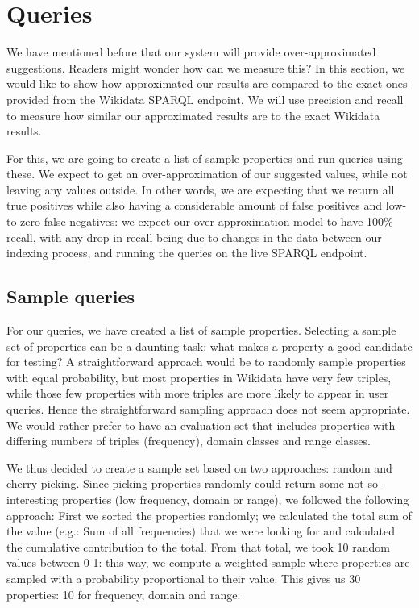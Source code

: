 
\section{Queries}

We have mentioned before that our system will provide over-approximated suggestions. Readers might wonder how can we measure this? In this section, we would like to show how approximated our results are compared to the exact ones provided from the Wikidata SPARQL endpoint. We will use precision and recall to measure how similar our approximated results are to the exact Wikidata results.

For this, we are going to create a list of sample properties and run queries using these. We expect to get an over-approximation of our suggested values, while not leaving any values outside. In other words, we are expecting that we return all true positives while also having a considerable amount of false positives and low-to-zero false negatives: we expect our over-approximation model to have 100\% recall, with any drop in recall being due to changes in the data between our indexing process, and running the queries on the live SPARQL endpoint.

\subsection{Sample queries}
For our queries, we have created a list of sample properties. Selecting a sample set of properties can be a daunting task: what makes a property a good candidate for testing? A straightforward approach would be to randomly sample properties with equal probability, but most properties in Wikidata have very few triples, while those few properties with more triples are more likely to appear in user queries. Hence the straightforward sampling approach does not seem appropriate. We would rather prefer to have an evaluation set that includes properties with differing numbers of triples (frequency), domain classes and range classes.

We thus decided to create a sample set based on two approaches: random and cherry picking. Since picking properties randomly could return some not-so-interesting properties (low frequency, domain or range), we followed the following approach: First we sorted the properties randomly; we calculated the total sum of the value (e.g.: Sum of all frequencies) that we were looking for and calculated the cumulative contribution to the total. From that total, we took 10 random values between 0-1: this way, we compute a weighted sample where properties are sampled with a probability proportional to their value. This gives us 30 properties: 10 for frequency, domain and range.


